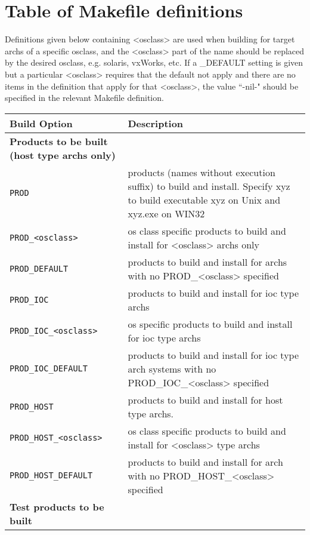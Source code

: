 \section{Table of Makefile definitions}

Definitions given below containing \textless{}osclass\textgreater{} are used when building for target archs of a specific osclass, and the 
\textless{}osclass\textgreater{} part of the name should be replaced by the desired osclass, e.g. solaris, vxWorks, etc. If a \_DEFAULT setting is 
given but a particular \textless{}osclass\textgreater{} requires that the default not apply and there are no items in the definition that apply for 
that \textless{}osclass\textgreater{}, the value ``-nil-" should be specified in the relevant Makefile definition.
\begin{center}
\begin{longtable}{p{2.94784in}p{3.76247in}}
\textbf{Build Option} & \textbf{Description}\\
\hline \hline
\textbf{Products to be built (host type archs only)} & \\
\hline
\verb|PROD| & products (names without execution suffix) to build and install. Specify xyz to build executable xyz on Unix and xyz.exe on WIN32\\
\verb|PROD_<osclass>| & os class specific products to build and install for \textless{}osclass\textgreater{} archs only\\
\verb|PROD_DEFAULT| & products to build and install for archs with no PROD\_\textless{}osclass\textgreater{} specified\\
\verb|PROD_IOC| & products to build and install for ioc type archs\\
\verb|PROD_IOC_<osclass>| & os specific products to build and install for ioc type archs\\
\verb|PROD_IOC_DEFAULT| & products to build and install for ioc type arch systems with no PROD\_IOC\_\textless{}osclass\textgreater{} specified\\
\verb|PROD_HOST| & products to build and install for host type archs. \\
\verb|PROD_HOST_<osclass>| & os class specific products to build and install for \textless{}osclass\textgreater{} type archs\\
\verb|PROD_HOST_DEFAULT| & products to build and install for arch with no PROD\_HOST\_\textless{}osclass\textgreater{} specified\\
\textbf{Test products to be built} & \\

\end{longtable}
\end{center}
